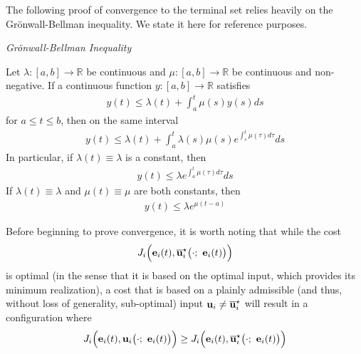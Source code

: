 The following proof of convergence to the terminal set relies heavily on the
Gr\"{o}nwall-Bellman inequality. We state it here for reference purposes.
\begin{bw_box}
  \begin{lemma} \cite{khalil_nonlinear_systems} \textit{Gr\"{o}nwall-Bellman Inequality}

    Let $\lambda : [a,b] \to \mathbb{R}$ be continuous and
    $\mu : [a,b] \to \mathbb{R}$ be continuous and non-negative. If a
    continuous function $y : [a,b] \to \mathbb{R}$ satisfies
    \begin{align}
      y(t) \leq \lambda(t) + \int_a^t \mu(s) y(s) ds
    \end{align}
    for $a \leq t \leq b$, then on the same interval
    \begin{align}
      y(t) \leq \lambda(t) + \int_a^t \lambda(s) \mu(s) e^{\int_s^t \mu(\tau)d\tau} ds
    \end{align}
    In particular, if $\lambda(t) \equiv \lambda$ is a constant, then
    \begin{align}
      y(t) \leq \lambda e^{\int_a^t \mu(\tau)d\tau} ds
    \end{align}
    If $\lambda(t) \equiv \lambda$ and $\mu(t) \equiv \mu$ are both constants,
    then
    \begin{align}
      y(t) \leq \lambda e^{\mu (t - a)}
    \end{align}
    \label{lemma:bellman_inequality}
  \end{lemma}
\end{bw_box}

Before beginning to prove convergence, it is worth noting that while the cost
$$J_i \Big(\vect{e}_i(t), \overline{\vect{u}}_i^{\star}\big(\cdot;\ \vect{e}_i(t)\big)\Big)$$
is optimal (in the sense that it is based on the optimal input, which provides
its minimum realization), a cost that is based on a plainly admissible
(and thus, without loss of generality, sub-optimal) input
$\bm{\mathbf{u}}_i \not= \overline{\bm{\mathbf{u}}}_i^{\star}$ will result in a configuration where
\begin{equation}
J_i \Big(\vect{e}_i(t), \vect{u}_i\big(\cdot;\ \vect{e}_i(t)\big)\Big)
\geq J_i \Big(\vect{e}_i(t), \overline{\vect{u}}_i^{\star}\big(\cdot;\ \vect{e}_i(t)\big)\Big)
\end{equation}

